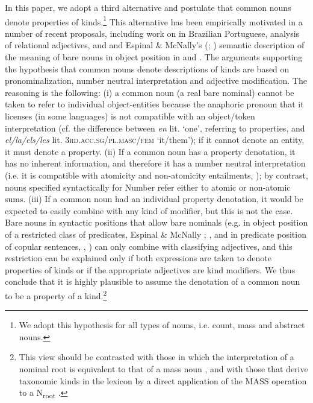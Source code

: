 \documentclass[output=paper
,modfonts
,nonflat]{langsci/langscibook}
\begin{document}
	In this paper, we adopt a third alternative and postulate that common nouns denote properties of kinds.\footnote{We adopt this hypothesis for all types of nouns, i.e. count, mass and abstract nouns.} This alternative has been empirically motivated in a number of recent proposals, including  work on  in Brazilian Portuguese,  analysis of relational adjectives, and  and Espinal \& McNally's (\citeyear{Espinal2007a}; \citeyear{Espinal2011})  semantic description of the meaning of bare nouns in object position in  and . The arguments supporting the hypothesis that common nouns denote descriptions of kinds are based on pronominalization, number neutral interpretation and adjective modification. The reasoning is the following: (i) a common noun (a real bare nominal) cannot be taken to refer to individual object-entities because the anaphoric pronoun that it licenses (in some  languages) is not compatible with an object/token interpretation (cf. the difference between  \textit{en} lit. `one', referring to properties, and \textit{el/la/els/les} lit. 3\textsc{rd.acc.sg/pl.masc/fem} `it/them'); if it cannot denote an entity, it must denote a property. (ii) If a common noun has a property denotation, it has no inherent  information, and therefore it has a number neutral interpretation (i.e. it is compatible with atomicity and non-atomicity entailments, \citealt{Farkas2003}); by contrast, nouns specified syntactically for Number refer either to atomic or non-atomic sums. (iii) If a common noun had an individual property denotation, it would be expected to easily combine with any kind of modifier, but this is not the case. Bare nouns in syntactic positions that allow bare nominals (e.g. in object position of a restricted class of predicates, Espinal \& McNally \citeyear{Espinal2007a}; \citeyear{Espinal2011}, and in predicate position of copular sentences, \citealt{deSwart2007}, \citealt{Zamparelli2008}) can only combine with classifying adjectives, and this restriction can be explained only if both expressions are taken to denote properties of kinds or if the appropriate adjectives are kind modifiers. We thus conclude that it is highly plausible to assume the denotation of a common noun to be a property of a kind.\footnote{This view should be contrasted with those in which the interpretation of a nominal root is equivalent to that of a mass noun \citep{Borer2005,Rothstein2010}, and with those that derive taxonomic kinds in the lexicon by a direct application of the MASS operation to a N\textsubscript{root} \citep{PiresdeOliveira2011,Trugman2013}.}
	
\end{document}
